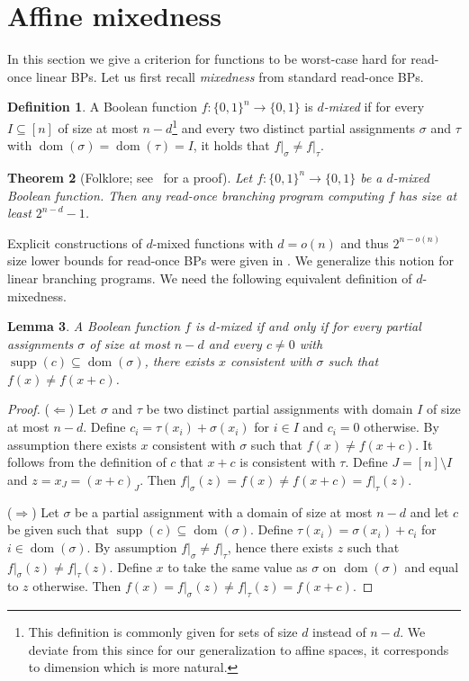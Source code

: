 \documentclass[a4paper,11pt,draft]{article}
\newtheorem{theorem}{Theorem}
\newtheorem{lemma}[theorem]{Lemma}
\theoremstyle{definition}
\newtheorem{definition}[theorem]{Definition}
\theoremstyle{remark}
\DeclareMathOperator{\supp}{supp}
\DeclareMathOperator{\dom}{dom}
\newcommand{\Q}{{\{0,1\}}}
\newcommand{\restr}[2]{\left.#1\right|_{#2}}
\newcommand{\readonce}{read-once}
\begin{document}
\section{Affine mixedness}

In this section we give a criterion for functions to be worst-case hard for \readonce{} linear BPs. Let us first recall \emph{mixedness} from standard read-once BPs.

\begin{definition}
  A Boolean function $f\colon \Q^n \to \Q$ is \emph{$d$-mixed} if for every $I \subseteq [n]$ of size at most $n-d$\footnote{This definition is commonly given for sets of size $d$ instead of $n - d$. We deviate from this since for our generalization to affine spaces, it corresponds to dimension which is more natural.} and every two distinct partial assignments $\sigma$ and $\tau$ with $\dom(\sigma) = \dom(\tau) = I$, it holds that $\restr{f}{\sigma} \neq \restr{f}{\tau}$.
\end{definition}

\begin{theorem}[Folklore; see~\cite{DBLP:books/daglib/0028687} for a proof]\label{thm:mixedness_1bp}
  Let $f\colon \Q^n \to \Q$ be a $d$-mixed Boolean function. Then any read-once branching program computing $f$ has size at least $2^{n-d}-1$.
\end{theorem}

Explicit constructions of $d$-mixed functions with $d = o(n)$ and thus $2^{n - o(n)}$ size lower bounds for read-once BPs were given in \cite{DBLP:journals/tcs/SavickyZ00,DBLP:conf/icalp/AndreevBCR99}. We generalize this notion for linear branching programs. We need the following equivalent definition of $d$-mixedness.

\begin{lemma}\label{lm:equiv_d-mixed}
  A Boolean function $f$ is $d$-mixed if and only if for every partial assignments $\sigma$ of size at most $n-d$ and every $c \neq 0$ with $\supp(c) \subseteq \dom(\sigma)$, there exists $x$ consistent with $\sigma$ such that $f(x) \neq f(x+c)$.
\end{lemma}
\begin{proof}
  ($\Leftarrow$) Let $\sigma$ and $\tau$ be two distinct partial assignments with domain $I$ of size at most $n - d$. Define $c_i = \tau(x_i) + \sigma(x_i)$ for $i \in I$ and $c_i = 0$ otherwise. By assumption there exists $x$ consistent with $\sigma$ such that $f(x) \ne f(x + c)$. It follows from the definition of $c$ that $x+c$ is consistent with $\tau$. Define $J = [n] \setminus I$ and $z = x_{J} = {(x+c)}_J$. Then $\restr{f}{\sigma}(z) = f(x) \neq f(x+c) = \restr{f}{\tau}(z)$.

  ($\Rightarrow$) Let $\sigma$ be a partial assignment with a domain of size at most $n - d$ and let $c$ be given such that $\supp(c) \subseteq \dom(\sigma)$. Define $\tau(x_i) = \sigma(x_i) + c_i$ for $i \in \dom(\sigma)$. By assumption $\restr{f}{\sigma} \neq \restr{f}{\tau}$, hence there exists $z$ such that $\restr{f}{\sigma}(z) \neq \restr{f}{\tau}(z)$. Define $x$ to take the same value as $\sigma$ on $\dom(\sigma)$ and equal to $z$ otherwise. Then $f(x) = \restr{f}{\sigma}(z) \neq \restr{f}{\tau}(z) = f(x+c)$.
\end{proof}
\end{document}
